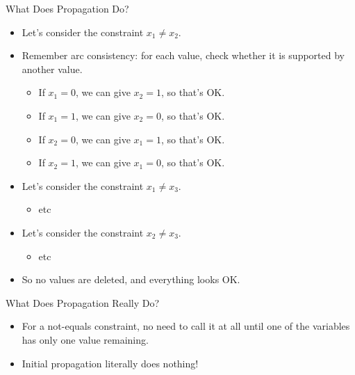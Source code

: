 \documentclass[aspectratio=169,compress,10pt]{beamer}
\begin{document}
\begin{frame}{What Does Propagation Do?}

    \begin{itemize}
        \item Let's consider the constraint $x_1 \ne x_2$.
        \item Remember arc consistency: for each value, check whether it is supported by another
            value.
            \begin{itemize}
                \item If $x_1 = 0$, we can give $x_2 = 1$, so that's OK.
                \item If $x_1 = 1$, we can give $x_2 = 0$, so that's OK.
                \item If $x_2 = 0$, we can give $x_1 = 1$, so that's OK.
                \item If $x_2 = 1$, we can give $x_1 = 0$, so that's OK.
            \end{itemize}
        \item Let's consider the constraint $x_1 \ne x_3$.
            \begin{itemize}
                \item etc
            \end{itemize}
        \item Let's consider the constraint $x_2 \ne x_3$.
            \begin{itemize}
                \item etc
            \end{itemize}
        \item So no values are deleted, and everything looks OK.
    \end{itemize}
\end{frame}

\begin{frame}{What Does Propagation Really Do?}
    \begin{itemize}
        \item For a not-equals constraint, no need to call it at all until one of the variables
            has only one value remaining.
        \item Initial propagation literally does nothing!
    \end{itemize}
\end{frame}
\end{document}
